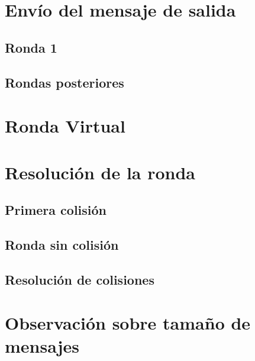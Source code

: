 \section{Envío del mensaje de salida}
\subsection{Ronda 1}
\subsection{Rondas posteriores}
\section{Ronda Virtual}
\section{Resolución de la ronda}
\subsection{Primera colisión}
\subsection{Ronda sin colisión}
\subsection{Resolución de colisiones}
\section{Observación sobre tamaño de mensajes}